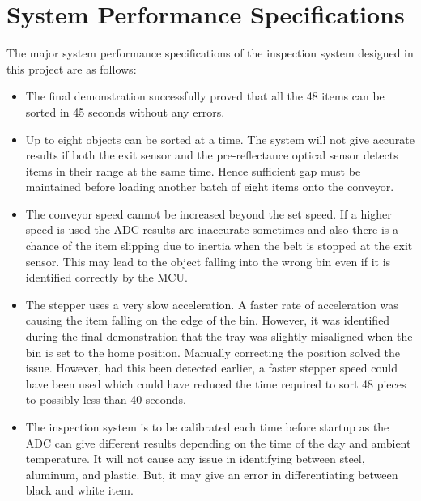 \section{System Performance Specifications}\label{sec:circuit}
The major system performance specifications of the inspection system designed in this project are as follows:
\begin{itemize}
	\item The final demonstration successfully proved that all the 48 items can be sorted in 45 seconds without any errors.
	\item Up to eight objects can be sorted at a time. The system will not give accurate results if both the exit sensor and the pre-reflectance optical sensor detects items in their range at the same time. Hence sufficient gap must be maintained before loading another batch of eight items onto the conveyor.
	\item The conveyor speed cannot be increased beyond the set speed. If a higher speed is used the ADC results are inaccurate sometimes and also there is a chance of the item slipping due to inertia when the belt is stopped at the exit sensor. This may lead to the object falling into the wrong bin even if it is identified correctly by the MCU.
	\item The stepper uses a very slow acceleration. A faster rate of acceleration was causing the item falling on the edge of the bin. However, it was identified during the final demonstration that the tray was slightly misaligned when the bin is set to the home position. Manually correcting the position solved the issue. However, had this been detected earlier, a faster stepper speed could have been used which could have reduced the time required to sort 48 pieces to possibly less than 40 seconds.
	\item The inspection system is to be calibrated each time before startup as the ADC can give different results depending on the time of the day and ambient temperature. It will not cause any issue in identifying between steel, aluminum, and plastic. But, it may give an error in differentiating between black and white item.
\end{itemize}